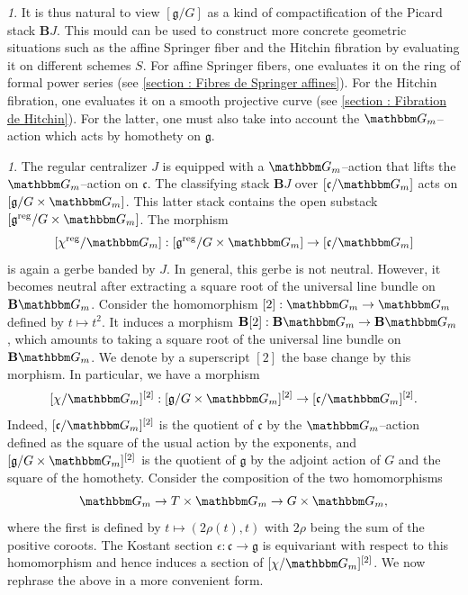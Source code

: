 \documentclass[12pt,english]{smfart}
\numberwithin{equation}{subsection}
\theoremstyle{remark}
\newtheorem{numero}[equation]{}
\newcommand\GG{{\mathbbm G}}
\newcommand\reg{{\rm reg}}
\begin{document}
\begin{numero}
It is thus natural to view $[\mathfrak{g}/G]$ as a kind of compactification of the Picard stack $\mathbf{B}J$. This mould can be used to construct more concrete geometric situations such as the affine Springer fiber and the Hitchin fibration by evaluating it on different schemes $S$. For affine Springer fibers, one evaluates it on the ring of formal power series (see \ref{section : Fibres de Springer affines}). For the Hitchin fibration, one evaluates it on a smooth projective curve (see \ref{section : Fibration de Hitchin}). For the latter, one must also take into account the $\GG_m$--action which acts by homothety on $\mathfrak{g}$.
\end{numero}

\begin{numero}
The regular centralizer $J$ is equipped with a $\GG_m$--action that lifts the $\GG_m$--action on $\mathfrak{c}$. The classifying stack $\mathbf{B}J$ over $[\mathfrak{c}/\GG_m]$ acts on $[\mathfrak{g}/G\times\GG_m]$. This latter stack contains the open substack $[\mathfrak{g}^\reg/G\times\GG_m]$. The morphism
\begin{equation}\label{mu}
[\chi^\reg/\GG_m]:[\mathfrak{g}^\reg/G\times\GG_m]\to [\mathfrak{c}/\GG_m]
\end{equation}
is again a gerbe banded by $J$. In general, this gerbe is not neutral. However, it becomes neutral after extracting a square root of the universal line bundle on $\mathbf{B}\GG_m$. Consider the homomorphism $[2]:\GG_m\to\GG_m$ defined by $t\mapsto t^2$. It induces a morphism $\mathbf{B}[2]:\mathbf{B}\GG_m\to\mathbf{B}\GG_m$, which amounts to taking a square root of the universal line bundle on $\mathbf{B}\GG_m$. We denote by a superscript $[2]$ the base change by this morphism. In particular, we have a morphism
$$
[\chi/\GG_m]^{[2]}:[\mathfrak{g}/G\times\GG_m]^{[2]}\to [\mathfrak{c}/\GG_m]^{[2]}.
$$
Indeed, $[\mathfrak{c}/\GG_m]^{[2]}$ is the quotient of $\mathfrak{c}$ by the $\GG_m$--action defined as the square of the usual action by the exponents, and $[\mathfrak{g}/G\times\GG_m]^{[2]}$ is the quotient of $\mathfrak{g}$ by the adjoint action of $G$ and the square of the homothety. Consider the composition of the two homomorphisms
$$
\GG_m\rightarrow T\times\GG_m\rightarrow G\times\GG_m,
$$
where the first is defined by $t\mapsto (2\rho(t),t)$ with $2\rho$ being the sum of the positive coroots. The Kostant section $\epsilon:\mathfrak{c}\to\mathfrak{g}$ is equivariant with respect to this homomorphism and hence induces a section of $[\chi/\GG_m]^{[2]}$. We now rephrase the above in a more convenient form.
\end{numero}
\end{document}
